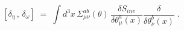 \begin{equation}\label{eq:comm}
[ \delta_\eta \,,\, \delta_\omega ] \;=\; \int d^3x \,
\Sigma_{\mu\nu}^{ab}(\theta) \, \frac{\delta S_{inv}}{\delta
  \theta_\mu^a (x)}  \frac{\delta }{\delta\theta_\nu^b (x)}  \;.
\end{equation}

